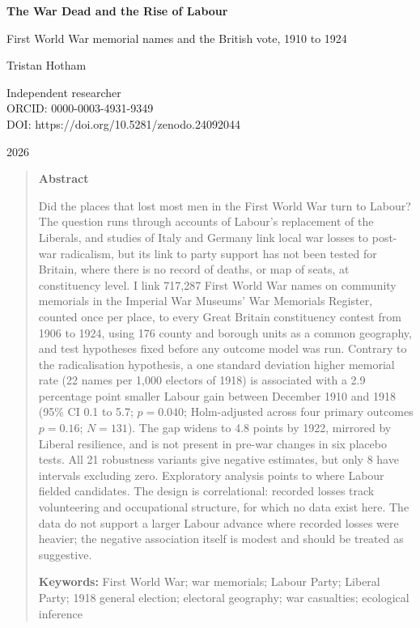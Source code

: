 \documentclass[11pt,a4paper]{article}
\begin{document}
\begin{center}
{\LARGE\bfseries The War Dead and the Rise of Labour\par}
\vspace{0.4em}
{\large First World War memorial names and the British vote, 1910 to 1924\par}
\vspace{1.2em}
{\large Tristan Hotham\par}
\vspace{0.3em}
{\small Independent researcher\\
ORCID: 0000-0003-4931-9349\\
DOI: https://doi.org/10.5281/zenodo.24092044\par}
\vspace{0.8em}
2026
\end{center}

\begin{quote}
\small
\begin{center}\textbf{Abstract}\end{center}
Did the places that lost most men in the First World War turn to Labour? The question runs through accounts of Labour's replacement of the Liberals, and studies of Italy and Germany link local war losses to post-war radicalism, but its link to party support has not been tested for Britain, where there is no record of deaths, or map of seats, at constituency level. I link 717,287 First World War names on community memorials in the Imperial War Museums' War Memorials Register, counted once per place, to every Great Britain constituency contest from 1906 to 1924, using 176 county and borough units as a common geography, and test hypotheses fixed before any outcome model was run. Contrary to the radicalisation hypothesis, a one standard deviation higher memorial rate (22 names per 1,000 electors of 1918) is associated with a 2.9 percentage point smaller Labour gain between December 1910 and 1918 (95\% CI 0.1 to 5.7; $p=0.040$; Holm-adjusted across four primary outcomes $p=0.16$; $N=131$). The gap widens to 4.8 points by 1922, mirrored by Liberal resilience, and is not present in pre-war changes in six placebo tests. All 21 robustness variants give negative estimates, but only 8 have intervals excluding zero. Exploratory analysis points to where Labour fielded candidates. The design is correlational: recorded losses track volunteering and occupational structure, for which no data exist here. The data do not support a larger Labour advance where recorded losses were heavier; the negative association itself is modest and should be treated as suggestive.

\textbf{Keywords:} First World War; war memorials; Labour Party; Liberal Party; 1918 general election; electoral geography; war casualties; ecological inference
\end{quote}
\end{document}

